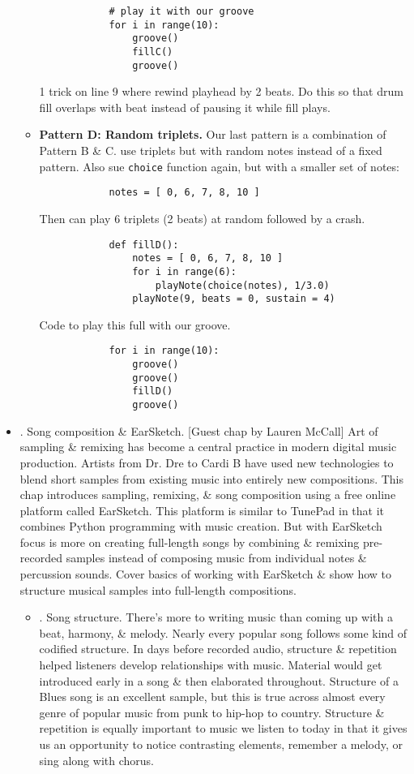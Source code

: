 \documentclass{article}
\begin{document}
\begin{itemize}
\begin{itemize}
\begin{verbatim}
			# play it with our groove
			for i in range(10):
			    groove()
			    fillC()
			    groove()
		\end{verbatim}
		1 trick on line 9 where rewind playhead by 2 beats. Do this so that drum fill overlaps with beat instead of pausing it while fill plays.
		\item {\bf Pattern D: Random triplets.} Our last pattern is a combination of Pattern B \& C. use triplets but with random notes instead of a fixed pattern. Also sue {\tt choice} function again, but with a smaller set of notes:
		\begin{verbatim}
			notes = [ 0, 6, 7, 8, 10 ]
		\end{verbatim}
		Then can play 6 triplets (2 beats) at random followed by a crash.
		\begin{verbatim}
			def fillD():
			    notes = [ 0, 6, 7, 8, 10 ]
			    for i in range(6):
			        playNote(choice(notes), 1/3.0)
			    playNote(9, beats = 0, sustain = 4)
		\end{verbatim}
		Code to play this full with our groove.
		\begin{verbatim}
			for i in range(10):
			    groove()
			    groove()
			    fillD()
			    groove()
		\end{verbatim}
	\end{itemize}
	\item {. Song composition \& EarSketch.} [Guest chap by {\sc Lauren McCall}] Art of sampling \& remixing has become a central practice in modern digital music production. Artists from Dr. {\sc Dre} to {\sc Cardi B} have used new technologies to blend short samples from existing music into entirely new compositions. This chap introduces sampling, remixing, \& song composition using a free online platform called EarSketch. This platform is similar to TunePad in that it combines Python programming with music creation. But with EarSketch focus is more on creating full-length  songs by combining \& remixing pre-recorded samples instead of composing music from individual notes \& percussion sounds. Cover basics of working with EarSketch \& show how to structure musical samples into full-length compositions.
	\begin{itemize}
		\item {. Song structure.} There's more to writing music than coming up with a beat, harmony, \& melody. Nearly every popular song follows some kind of codified structure. In days before recorded audio, structure \& repetition helped listeners develop relationships with music. Material would get introduced early in a song \& then elaborated throughout. Structure of a Blues song is an excellent sample, but this is true across almost every genre of popular music from punk to hip-hop to country. Structure \& repetition is equally important to music we listen to today in that it gives us an opportunity to notice contrasting elements, remember a melody, or sing along with chorus.
		

\end{itemize}
\end{itemize}
\end{document}
